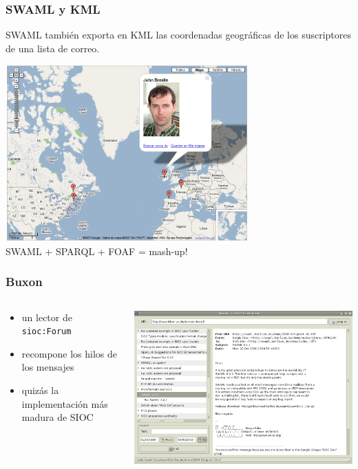 \documentclass[spanish,notes=hide]{beamer}
\begin{document}
\frame
{
  \frametitle{SWAML y KML}

  SWAML también exporta en KML las coordenadas geográficas de los suscriptores
  de una lista de correo.

  \begin{center}
    \includegraphics[width=0.7\textwidth]{images/googlemaps.png}\\
    SWAML + SPARQL + FOAF = mash-up!
  \end{center}
}
\frame
{
  \frametitle{Buxon}

  \begin{columns}
   \begin{column}{0.32\textwidth}
	\begin{itemize}
	  \item un lector de \texttt{sioc:Forum}
	  \item recompone los hilos de los mensajes
	  \item quizás la implementación más madura de SIOC
	\end{itemize}
   \end{column}
   \begin{column}{0.68\textwidth}
	\includegraphics[width=\textwidth]{images/buxon.png}
   \end{column}
  \end{columns}
}
\end{document}
